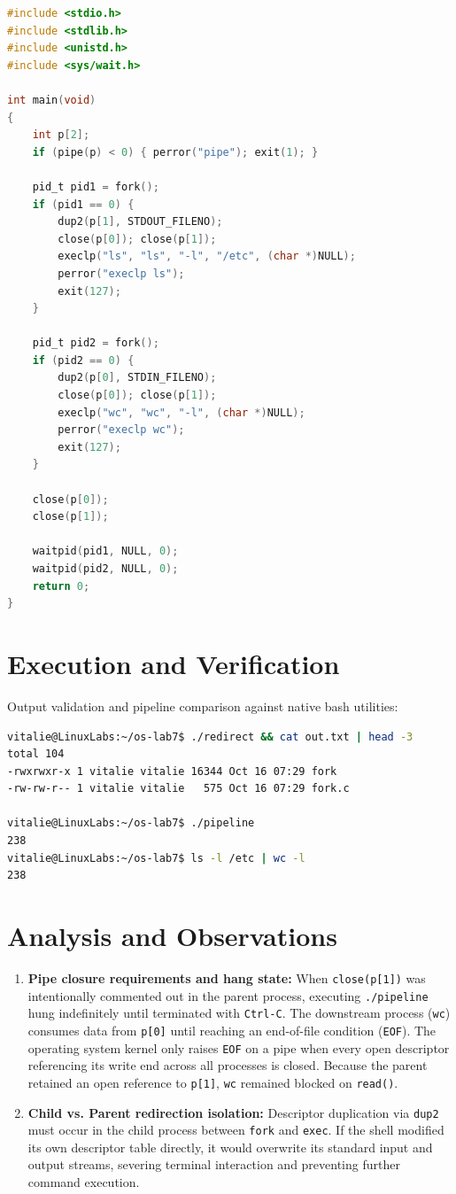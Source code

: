 \documentclass[12pt,a4paper]{report}
\numberwithin{equation}{chapter}
\numberwithin{figure}{chapter}
\numberwithin{table}{chapter}
\begin{document}
\begin{lstlisting}[language=C, caption={Pipeline orchestration in \texttt{pipeline.c}}]
#include <stdio.h>
#include <stdlib.h>
#include <unistd.h>
#include <sys/wait.h>

int main(void)
{
    int p[2];
    if (pipe(p) < 0) { perror("pipe"); exit(1); }

    pid_t pid1 = fork();
    if (pid1 == 0) {
        dup2(p[1], STDOUT_FILENO);
        close(p[0]); close(p[1]);
        execlp("ls", "ls", "-l", "/etc", (char *)NULL);
        perror("execlp ls");
        exit(127);
    }

    pid_t pid2 = fork();
    if (pid2 == 0) {
        dup2(p[0], STDIN_FILENO);
        close(p[0]); close(p[1]);
        execlp("wc", "wc", "-l", (char *)NULL);
        perror("execlp wc");
        exit(127);
    }

    close(p[0]);
    close(p[1]);

    waitpid(pid1, NULL, 0);
    waitpid(pid2, NULL, 0);
    return 0;
}
\end{lstlisting}

\section{Execution and Verification}
Output validation and pipeline comparison against native bash utilities:
\begin{lstlisting}[language=bash]
vitalie@LinuxLabs:~/os-lab7$ ./redirect && cat out.txt | head -3
total 104
-rwxrwxr-x 1 vitalie vitalie 16344 Oct 16 07:29 fork
-rw-rw-r-- 1 vitalie vitalie   575 Oct 16 07:29 fork.c

vitalie@LinuxLabs:~/os-lab7$ ./pipeline
238
vitalie@LinuxLabs:~/os-lab7$ ls -l /etc | wc -l
238
\end{lstlisting}

\section{Analysis and Observations}
\begin{enumerate}
    \item \textbf{Pipe closure requirements and hang state:}
    When \texttt{close(p[1])} was intentionally commented out in the parent process, executing \texttt{./pipeline} hung indefinitely until terminated with \texttt{Ctrl-C}. The downstream process (\texttt{wc}) consumes data from \texttt{p[0]} until reaching an end-of-file condition (\texttt{EOF}). The operating system kernel only raises \texttt{EOF} on a pipe when every open descriptor referencing its write end across all processes is closed. Because the parent retained an open reference to \texttt{p[1]}, \texttt{wc} remained blocked on \texttt{read()}.
    \item \textbf{Child vs. Parent redirection isolation:}
    Descriptor duplication via \texttt{dup2} must occur in the child process between \texttt{fork} and \texttt{exec}. If the shell modified its own descriptor table directly, it would overwrite its standard input and output streams, severing terminal interaction and preventing further command execution.
\end{enumerate}
\end{document}

